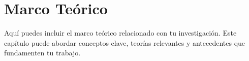 \chapter{Marco Teórico}
\label{chap:marco_teorico}

Aquí puedes incluir el marco teórico relacionado con tu investigación. Este capítulo puede abordar conceptos clave, teorías relevantes y antecedentes que fundamenten tu trabajo.
